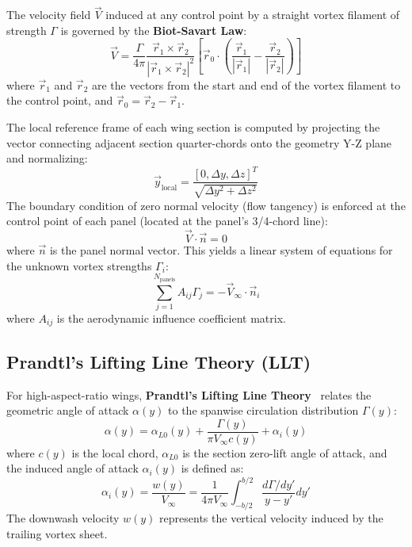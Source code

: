 \documentclass[11pt]{article}
\begin{document}
The velocity field $\vec{V}$ induced at any control point by a straight vortex filament of strength $\Gamma$ is governed by the \textbf{Biot-Savart Law}:
\begin{equation}
    \vec{V} = \frac{\Gamma}{4\pi} \frac{\vec{r}_1 \times \vec{r}_2}{|\vec{r}_1 \times \vec{r}_2|^2} \left[ \vec{r}_0 \cdot \left( \frac{\vec{r}_1}{|\vec{r}_1|} - \frac{\vec{r}_2}{|\vec{r}_2|} \right) \right]
\end{equation}
where $\vec{r}_1$ and $\vec{r}_2$ are the vectors from the start and end of the vortex filament to the control point, and $\vec{r}_0 = \vec{r}_2 - \vec{r}_1$.

The local reference frame of each wing section is computed by projecting the vector connecting adjacent section quarter-chords onto the geometry Y-Z plane and normalizing:
\begin{equation}
    \vec{y}_{\text{local}} = \frac{[0, \Delta y, \Delta z]^T}{\sqrt{\Delta y^2 + \Delta z^2}}
\end{equation}
The boundary condition of zero normal velocity (flow tangency) is enforced at the control point of each panel (located at the panel's 3/4-chord line):
\begin{equation}
    \vec{V} \cdot \vec{n} = 0
\end{equation}
where $\vec{n}$ is the panel normal vector. This yields a linear system of equations for the unknown vortex strengths $\Gamma_i$:
\begin{equation}
    \sum_{j=1}^{N_{\text{panels}}} A_{ij} \Gamma_j = - \vec{V}_\infty \cdot \vec{n}_i
\end{equation}
where $A_{ij}$ is the aerodynamic influence coefficient matrix.

\subsection{Prandtl's Lifting Line Theory (LLT)}
For high-aspect-ratio wings, \textbf{Prandtl's Lifting Line Theory}~\cite{prandtl1918} relates the geometric angle of attack $\alpha(y)$ to the spanwise circulation distribution $\Gamma(y)$:
\begin{equation}
    \alpha(y) = \alpha_{L0}(y) + \frac{\Gamma(y)}{\pi V_\infty c(y)} + \alpha_i(y)
\end{equation}
where $c(y)$ is the local chord, $\alpha_{L0}$ is the section zero-lift angle of attack, and the induced angle of attack $\alpha_i(y)$ is defined as:
\begin{equation}
    \alpha_i(y) = \frac{w(y)}{V_\infty} = \frac{1}{4\pi V_\infty} \int_{-b/2}^{b/2} \frac{d\Gamma/dy'}{y - y'} dy'
\end{equation}
The downwash velocity $w(y)$ represents the vertical velocity induced by the trailing vortex sheet.
\end{document}
